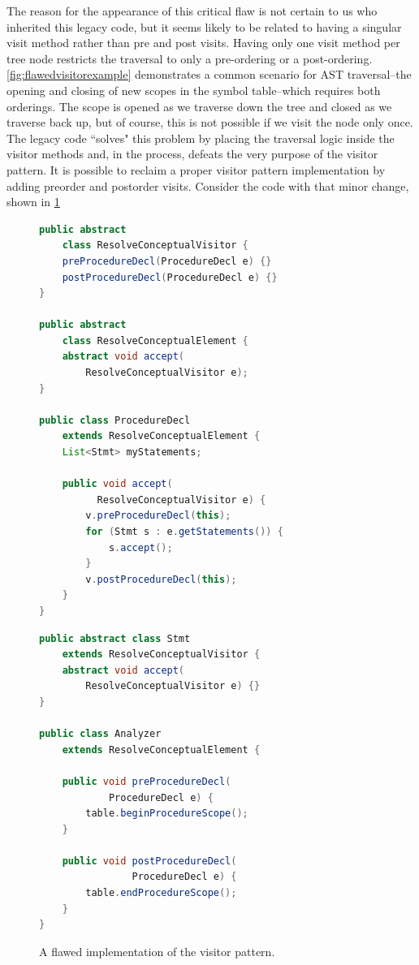 \documentclass[times]{speauth}
\begin{document}
The reason for the appearance of this critical flaw is not certain to us who inherited this legacy code, but it seems likely to be related to having a singular visit method rather than pre and post visits. Having only one visit method per tree node restricts the traversal to only a pre-ordering or a post-ordering. \ref{fig:flawedvisitorexample} demonstrates a common scenario for AST traversal--the opening and closing of new scopes in the symbol table--which requires both orderings. The scope is opened as we traverse down the tree and closed as we traverse back up, but of course, this is not possible if we visit the node only once. The legacy code ``solves" this problem by placing the traversal logic inside the visitor methods and, in the process, defeats the very purpose of the visitor pattern. It is possible to reclaim a proper visitor pattern implementation by adding preorder and postorder visits. Consider the code with that minor change, shown in \ref{fig:fixedvisitorexample}

\begin{figure}[!htb]
\centering
\begin{minipage}{.45\textwidth}
\begin{lstlisting}[language=java]
public abstract
	class ResolveConceptualVisitor {
    preProcedureDecl(ProcedureDecl e) {}
    postProcedureDecl(ProcedureDecl e) {}
}

public abstract
	class ResolveConceptualElement {
    abstract void accept(
        ResolveConceptualVisitor e);
}

public class ProcedureDecl
	extends ResolveConceptualElement {	
    List<Stmt> myStatements;

    public void accept(
    	  ResolveConceptualVisitor e) {
        v.preProcedureDecl(this);
        for (Stmt s : e.getStatements()) {
            s.accept();
        }
        v.postProcedureDecl(this);
    }
}
\end{lstlisting}
\end{minipage}\quad
\begin{minipage}{.45\textwidth}
\begin{lstlisting}[language=java]
public abstract class Stmt
	extends ResolveConceptualVisitor {
    abstract void accept(
    	ResolveConceptualVisitor e) {}
}

public class Analyzer
	extends ResolveConceptualElement {
	
    public void preProcedureDecl(
  			ProcedureDecl e) {
        table.beginProcedureScope();
    }

    public void postProcedureDecl(
    			ProcedureDecl e) {
        table.endProcedureScope();
    }
}
\end{lstlisting}
\end{minipage}
\caption{A flawed implementation of the visitor pattern.}
\label{fig:fixedvisitorexample}
\end{figure}
\end{document}
